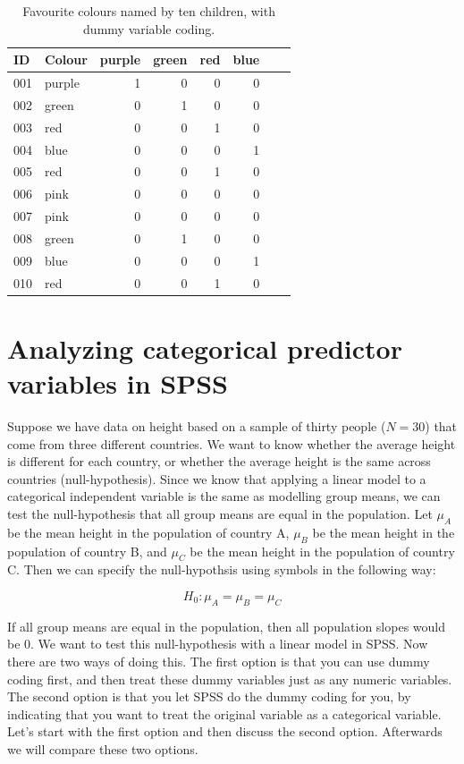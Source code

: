 \documentclass[]{report}\usepackage[]{graphicx}\usepackage[]{color}
\begin{document}
\begin{table}
\caption{Favourite colours named by ten children, with dummy variable coding.}
 \begin{tabular}{llrrrrrr}
 ID & Colour &  purple &green&red&blue&&\\ \hline
  001 &purple & 1&0&0&0&\\
  002 &green &  0&1&0&0&\\
  003 &red & 0&0&1&0&\\
  004 &blue &  0&0&0&1&\\
  005 &red & 0&0&1&0&\\
  006 &pink &  0&0&0&0&\\
  007 &pink &  0&0&0&0&\\
  008 &green &  0&1&0&0&\\
  009 &blue &  0&0&0&1&\\
  010 &red &  0&0&1&0&\\
 \end{tabular}
 \label{tab:coloursexample}
 \end{table}





\section{Analyzing categorical predictor variables in SPSS}

Suppose we have data on height based on a sample of thirty people ($N=30$) that come from three different countries. We want to know whether the average height is different for each country, or whether the average height is the same across countries (null-hypothesis). Since we know that applying a linear model to a categorical independent variable is the same as modelling group means, we can test the null-hypothesis that all group means are equal in the population. Let $\mu_A$ be the mean height in the population of country A, $\mu_B$ be the mean height in the population of country B, and $\mu_C$ be the mean height in the population of country C. Then we can specify the null-hypothsis using symbols in the following way:

\begin{equation}
H_0: \mu_A= \mu_B=\mu_C
\end{equation}

If all group means are equal in the population, then all population slopes would be 0. We want to test this null-hypothesis with a linear model in SPSS. Now there are two ways of doing this. The first option is that you can use dummy coding first, and then treat these dummy variables just as any numeric variables. The second option is that you let SPSS do the dummy coding for you, by indicating that you want to treat the original variable as a categorical variable. Let's start with the first option and then discuss the second option. Afterwards we will compare these two options.
\end{document}
